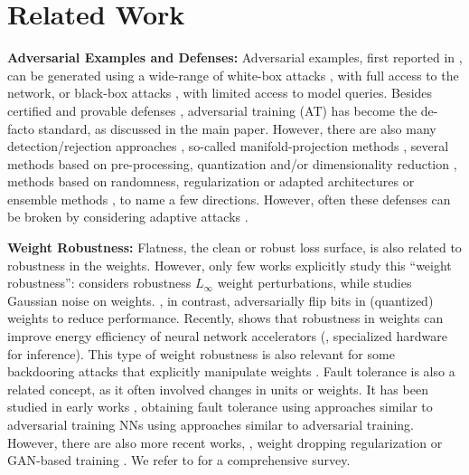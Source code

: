 \section{Related Work}
\label{sec:supp-related-work}

\textbf{Adversarial Examples and Defenses:} Adversarial examples, first reported in \cite{SzegedyARXIV2013}, can be generated using a wide-range of white-box attacks \cite{SzegedyARXIV2013,GoodfellowARXIV2014,KurakinARXIV2016b,PapernotSP2016b,MoosaviCVPR2016,MadryARXIV2017,CarliniSP2017,DongCVPR2018,LuoAAAI2018}, with full access to the network, or black-box attacks \cite{ChenAISEC2017,BrendelARXIV2017a,SuARXV2017,IlyasARXIV2018,SarkarARXIV2017,NarodytskaCVPRWORK2017}, with limited access to model queries.
Besides certified and provable defenses \cite{CohenARXIV2019,YangARXIV2020,KumarARXIV2020b,ZhangNIPS2018,ZhangARXIV2019,WongICML2018,GowalARXIV2019,GehrSP2018,MirmanICML2018,SinghNIPS2018,LeeARXIV2019,CroceARXIV2018}, adversarial training (AT) has become the de-facto standard, as discussed in the main paper. However, there are also many detection/rejection approaches \cite{GrosseARXIV2017,FeinmanARXIV2017,LiaoCVPR2018,MaARXIV2018,AmsalegWIFS2017,MetzenARXIV2017}, so-called manifold-projection methods \cite{IlyasARXIV2017,SamangoueiICLR2018,SchottARXIV2018,ShenARXIV2017}, several methods based on pre-processing, quantization and/or dimensionality reduction \cite{BuckmanICLR2018,PrakashDCC2018,BhagojiARXIV2017}, methods based on randomness, regularization or adapted architectures \cite{ZantedschiAISEC2017,BhagojiARXIV2017,NayebiARXIV2017,SimonGabrielARXIV2018,HeinNIPS2017,JakubovitzARXIV2018,RossAAAI2018,KannanARXIV2018,LambARXIV2018,XieICLR2018} or ensemble methods \cite{LiuARXIV2017,StraussARXIV2017,HeUSENIXWORK2017,TramerICLR2018}, to name a few directions. However, often these defenses can be broken by considering adaptive attacks \cite{CarliniAISec2017,CarliniARXIV2016,AthalyeARXIV2018b,AthalyeARXIV2018}.

\textbf{Weight Robustness:} Flatness, \wrt the clean or robust loss surface, is also related to robustness in the weights. However, only few works explicitly study this ``weight robustness'': \cite{WengAAAI2020} considers robustness \wrt $L_\infty$ weight perturbations, while \cite{CheneyARXIV2017} studies Gaussian noise on weights. \cite{RakinICCV2019,HeCVPR2020}, in contrast, adversarially flip bits in (quantized) weights to reduce performance. Recently, \cite{StutzMLSYS2021} shows that robustness in weights can improve energy efficiency of neural network accelerators (\ie, specialized hardware for inference). This type of weight robustness is also relevant for some backdooring attacks that explicitly manipulate weights \cite{JiCCS2018,DumfordARXIV2018}. Fault tolerance is also a related concept, as it often involved changes in units or weights. It has been studied in early works \cite{NetiTNN1992,Chiu1994,DeodhareTNN1998}, obtaining fault tolerance using approaches similar to adversarial training NNs using approaches similar to adversarial training. However, there are also more recent works, \eg, weight dropping regularization \cite{RahmanICIP2018} or GAN-based training \cite{DudduARXIV2019}. We refer to \cite{TorreshuitzilIEEEACCESS2017} for a comprehensive survey.